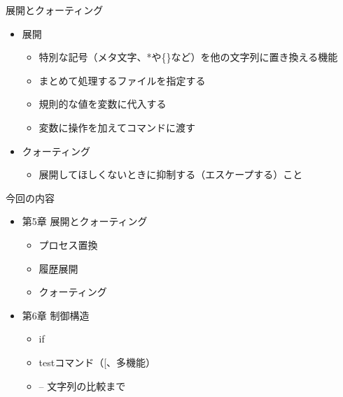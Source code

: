 \documentclass[12pt,aspectratio=169]{beamer}
\begin{document}
\begin{frame}{展開とクォーティング}

  \begin{itemize}
    \item 展開
    \begin{itemize}
      \item 特別な記号（メタ文字、*や\{\}など）を他の文字列に置き換える機能
      \item まとめて処理するファイルを指定する
      \item 規則的な値を変数に代入する
      \item 変数に操作を加えてコマンドに渡す
    \end{itemize}

    \item クォーティング
    \begin{itemize}
      \item 展開してほしくないときに抑制する（エスケープする）こと
    \end{itemize}

  \end{itemize}

\end{frame}


\begin{frame}{今回の内容}

  \begin{itemize}
    \item 第5章 展開とクォーティング
    \begin{itemize}
      \item プロセス置換
      \item 履歴展開
      \item クォーティング
    \end{itemize}
    \item 第6章 制御構造
      \begin{itemize}
        \item if
        \item testコマンド（[、多機能）
        \item -- 文字列の比較まで
      \end{itemize}

  \end{itemize}

\end{frame}
\end{document}

